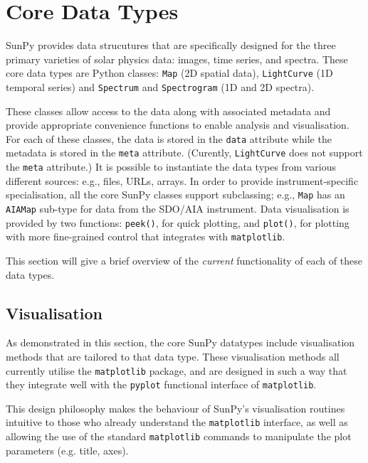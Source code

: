 \section{Core Data Types}\label{sec:DataTypes}

SunPy provides data strucutures that are specifically designed for the
three primary varieties of solar physics data: images, time series, and
spectra. These core data types are Python classes:
\texttt{Map} (2D spatial data), \texttt{LightCurve} (1D temporal series)
and \texttt{Spectrum} and \texttt{Spectrogram} (1D and 2D spectra). 

These classes allow access to the data
along with associated metadata and provide appropriate convenience functions to
enable analysis and visualisation. For each of these classes, the data is
stored in the \texttt{data} attribute while the metadata is stored 
in the \texttt{meta} attribute. (Curently, \texttt{LightCurve} does 
not support the \texttt{meta} attribute.) 
It is possible to instantiate the
data types from various
different sources: e.g., files, URLs, arrays.  
In order to provide instrument-specific specialisation, all the core SunPy classes 
support subclassing; e.g., \texttt{Map} has an \texttt{AIAMap} 
sub-type for data from the SDO/AIA instrument. 
Data visualisation is provided by two functions: \texttt{peek()}, for quick 
plotting, and \texttt{plot()}, for plotting with more fine-grained control that 
integrates with \texttt{matplotlib}.

This section will give a brief overview of the \textit{current} functionality 
of each of these data types.





\subsection{Visualisation}
\label{subsec:Viz}
As demonstrated in this section, the core SunPy datatypes 
include visualisation methods that are tailored to that data type. 
These visualisation methods all currently utilise the \texttt{matplotlib} 
package, and are designed in such a way that they integrate well with 
the \texttt{pyplot} functional interface of \texttt{matplotlib}.

This design philosophy makes the behaviour of SunPy's visualisation 
routines intuitive to those who already understand the \texttt{matplotlib}
interface, as well as allowing the use of the standard 
\texttt{matplotlib} commands to manipulate the plot parameters (e.g. title, axes).
